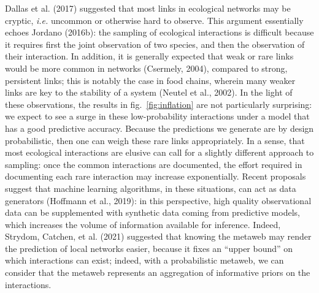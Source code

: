 \documentclass[10pt,oneside]{article}
\begin{document}
Dallas et al. (2017) suggested that most links in ecological networks
may be cryptic, \emph{i.e.} uncommon or otherwise hard to observe. This
argument essentially echoes Jordano (2016b): the sampling of ecological
interactions is difficult because it requires first the joint
observation of two species, and then the observation of their
interaction. In addition, it is generally expected that weak or rare
links would be more common in networks (Csermely, 2004), compared to
strong, persistent links; this is notably the case in food chains,
wherein many weaker links are key to the stability of a system (Neutel
et al., 2002). In the light of these observations, the results in
fig.~\ref{fig:inflation} are not particularly surprising: we expect to
see a surge in these low-probability interactions under a model that has
a good predictive accuracy. Because the predictions we generate are by
design probabilistic, then one can weigh these rare links appropriately.
In a sense, that most ecological interactions are elusive can call for a
slightly different approach to sampling: once the common interactions
are documented, the effort required in documenting each rare interaction
may increase exponentially. Recent proposals suggest that machine
learning algorithms, in these situations, can act as data generators
(Hoffmann et al., 2019): in this perspective, high quality observational
data can be supplemented with synthetic data coming from predictive
models, which increases the volume of information available for
inference. Indeed, Strydom, Catchen, et al. (2021) suggested that
knowing the metaweb may render the prediction of local networks easier,
because it fixes an ``upper bound'' on which interactions can exist;
indeed, with a probabilistic metaweb, we can consider that the metaweb
represents an aggregation of informative priors on the interactions.
\end{document}

